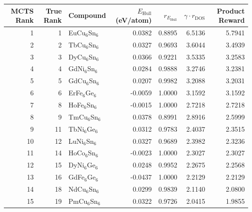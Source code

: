 \begin{tabular}{rrlrrrr}
\toprule
MCTS Rank & True Rank & Compound & $E_{\mathrm{Hull}}$ (eV/atom) & $r_{E_{\mathrm{Hull}}}$ & $\gamma \cdot r_{\mathrm{DOS}}$ & Product Reward \\

\midrule
1 & 1 & EuCu$_{6}$Sn$_{6}$ & 0.0382 & 0.8895 & 6.5136 & 5.7941 \\

2 & 2 & TbCu$_{6}$Sn$_{6}$ & 0.0327 & 0.9693 & 3.6044 & 3.4939 \\

3 & 3 & DyCu$_{6}$Sn$_{6}$ & 0.0366 & 0.9221 & 3.5335 & 3.2583 \\

4 & 4 & GdNi$_{6}$Sn$_{6}$ & 0.0284 & 0.9888 & 3.2746 & 3.2381 \\

5 & 5 & GdCu$_{6}$Sn$_{6}$ & 0.0207 & 0.9982 & 3.2088 & 3.2031 \\

6 & 6 & ErFe$_{6}$Ge$_{6}$ & -0.0059 & 1.0000 & 3.1592 & 3.1592 \\

7 & 8 & HoFe$_{6}$Sn$_{6}$ & -0.0015 & 1.0000 & 2.7218 & 2.7218 \\

8 & 9 & TmCu$_{6}$Sn$_{6}$ & 0.0378 & 0.8991 & 2.8916 & 2.5999 \\

9 & 11 & TbNi$_{6}$Ge$_{6}$ & 0.0312 & 0.9783 & 2.4037 & 2.3515 \\

10 & 12 & LuNi$_{6}$Sn$_{6}$ & 0.0327 & 0.9689 & 2.3982 & 2.3236 \\

11 & 14 & HoCo$_{6}$Sn$_{6}$ & -0.0023 & 1.0000 & 2.3027 & 2.3027 \\

12 & 15 & DyNi$_{6}$Ge$_{6}$ & 0.0248 & 0.9952 & 2.2675 & 2.2568 \\

13 & 16 & GdFe$_{6}$Ge$_{6}$ & -0.0437 & 1.0000 & 2.2129 & 2.2129 \\

14 & 18 & NdCu$_{6}$Sn$_{6}$ & 0.0299 & 0.9839 & 2.1140 & 2.0800 \\

15 & 19 & PmCu$_{6}$Sn$_{6}$ & 0.0322 & 0.9726 & 2.0415 & 1.9855 \\

\bottomrule
\end{tabular}